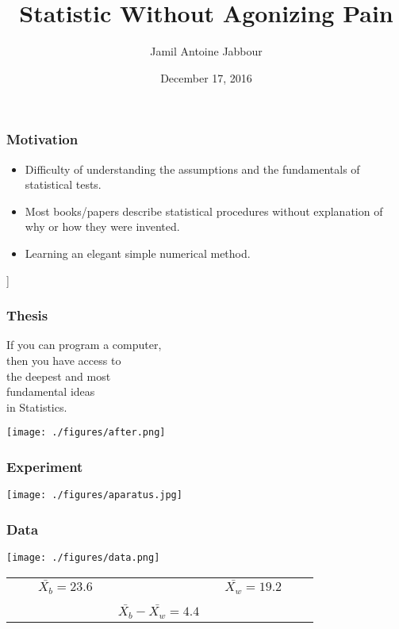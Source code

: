

\title{Statistic Without Agonizing Pain
\hspace{2cm}}
\author{{Jamil Antoine Jabbour}}
\date{{December 17, 2016}}

\begin{frame}
\titlepage
\end{frame}

\begin{frame}
\frametitle{Motivation}
\begin{itemize}[<+->]
  \item Difficulty of understanding the assumptions and the fundamentals of statistical tests.
  \vspace{1cm}
  \item Most books/papers describe statistical  procedures without explanation of why or how they were invented.
  \vspace{1cm}
  \item Learning an elegant simple numerical method. 
\end{itemize}]

\end{frame}


\begin{frame}
\frametitle{Thesis}
\vspace{-1cm}
\begin{center}
\alert{\Huge If you can program a computer, \\
then you have access to \\
the deepest and most\\
fundamental ideas\\ \vspace{.5cm}
in Statistics.}
\end{center}

\end{frame}

\begin{frame}
\centerline{\texttt{[image: ./figures/after.png]}}
\end{frame}

\begin{frame}
\frametitle{Experiment}
\centerline{\texttt{[image: ./figures/aparatus.jpg]}}
\end{frame}

\begin{frame}[<+->]
\frametitle{Data}
\centerline{\texttt{[image: ./figures/data.png]}}
\begin{center}\begin{tabular}{ccccccccc}
 &&$\bar{X_b} = 23.6$ &&&& $\bar{X_w}= 19.2 $&&\\
 &&&&&&&& \\
&&&&  $\bar{X_b}- \bar{X_w} = 4.4$&&&&
\end{tabular}\end{center}
\end{frame}

